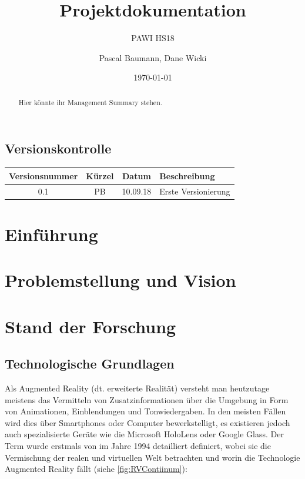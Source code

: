 \documentclass[a4paper]{scrreprt}
\title{Projektdokumentation}
\subtitle{PAWI HS18}
\author{Pascal Baumann, Dane Wicki}
\date{\today}
\begin{document}
\begin{titlepage}
\maketitle
\end{titlepage}

\renewcommand{\abstractname}{Management Summary}
\begin{abstract}
	Hier könnte ihr Management Summary stehen.
\end{abstract}

\section*{Versionskontrolle}

\begin{tabularx}{\textwidth}{|c|c|c|X|}
	\hline
	\textbf{Versionsnummer} & \textbf{Kürzel} & \textbf{Datum} & \textbf{Beschreibung} \\
	\hline
	0.1 & PB & 10.09.18 & Erste Versionierung \\
	\hline
\end{tabularx}

\tableofcontents

\chapter{Einführung}

\chapter{Problemstellung und Vision}

\chapter{Stand der Forschung}

\section{Technologische Grundlagen}
Als Augmented Reality (dt. erweiterte Realität) versteht man heutzutage meistens das Vermitteln von Zusatzinformationen über die Umgebung in Form von Animationen, Einblendungen und Tonwiedergaben. In den meisten Fällen wird dies über Smartphones oder Computer bewerkstelligt, es existieren jedoch auch spezialisierte Geräte wie die Microsoft HoloLens oder Google Glass. Der Term wurde erstmals von \citeauthor{Milgram1994} im Jahre 1994 detailliert definiert, wobei sie die Vermischung der realen und virtuellen Welt betrachten und worin die Technologie Augmented Reality fällt (siehe \ref{fig:RVContiinum}):
\end{document}
